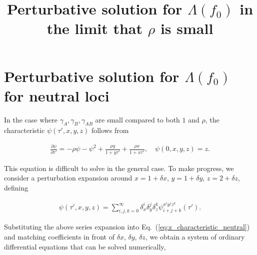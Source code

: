\documentclass[11pt]{article}
\title{\vspace{-36 pt} \Large Perturbative solution for $\Lambda(f_0)$ in the limit that $\rho$ is small \vspace{-36 pt}}
\date{}
\begin{document}
\section*{Perturbative solution for $\Lambda(f_0)$ for neutral loci}
In the case where $\gamma_A, \gamma_B, \gamma_{AB}$ are small compared to both $1$ and $\rho$, the characteristic $\psi(\tau', x, y, z)$ follows from 

\begin{align}\label{eq:z_characteristic_neutral}
    \frac{\partial \psi}{\partial \tau'} = -\rho \psi -\psi^2 + \frac{\rho y}{1+y\tau'} + \frac{\rho x}{1+x\tau'}, \quad \psi(0, x, y, z) = z.
\end{align}

This equation is difficult to solve in the general case. To make progress, we consider a perturbation expansion around $x=1+\delta x$, $y=1+\delta y$, $z=2+\delta z$, defining

\begin{align}\label{eq:psi_xyz_expansion}
    \psi(\tau', x, y, z) 
    = \sum_{i, j, k=0}^{\infty} \delta_x^i \delta_y^j \delta_z^k \psi_{i + j + k}^{x^i y^j z^k}(\tau').
\end{align}

Substituting the above series expansion into Eq.~(\ref{eq:z_characteristic_neutral}) and matching coefficients in front of $\delta x$, $\delta y$, $\delta z$, we obtain a system of ordinary differential equations that can be solved numerically, 
\end{document}
